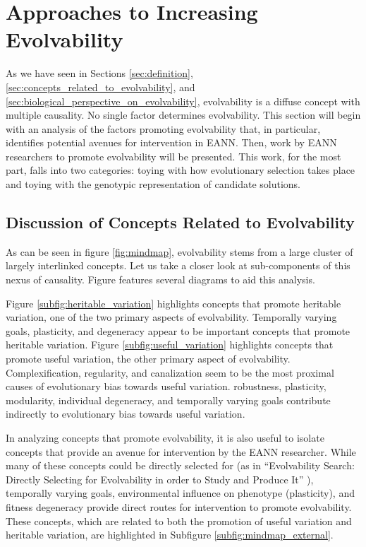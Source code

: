 \chapter{Approaches to Increasing Evolvability} \label{subsec:approaches_to_promoting_evolvability.tex}

As we have seen in Sections \ref{sec:definition}, \ref{sec:concepts_related_to_evolvability}, and \ref{sec:biological_perspective_on_evolvability}, evolvability is a diffuse concept with multiple causality. No single factor determines evolvability. This section will begin with an analysis of the factors promoting evolvability that, in particular, identifies potential avenues for intervention in EANN. Then, work by EANN researchers to promote evolvability will be presented. This work, for the most part, falls into two categories: toying with how evolutionary selection takes place and toying with the genotypic representation of candidate solutions.

\section{Discussion of Concepts Related to Evolvability}
As can be seen in figure \ref{fig:mindmap}, evolvability stems from a large cluster of largely interlinked concepts. Let us take a closer look at sub-components of this nexus of causality. Figure  features several diagrams to aid this analysis. 

Figure \ref{subfig:heritable_variation} highlights concepts that promote heritable variation, one of the two primary aspects of evolvability. Temporally varying goals, plasticity, and degeneracy appear to be important concepts that promote heritable variation. Figure \ref{subfig:useful_variation} highlights concepts that promote useful variation, the other primary aspect of evolvability. Complexification, regularity, and canalization seem to be the most proximal causes of evolutionary bias towards useful variation. robustness, plasticity, modularity, individual degeneracy, and temporally varying goals contribute indirectly to evolutionary bias towards useful variation.

In analyzing concepts that promote evolvability, it is also useful to isolate concepts that provide an avenue for intervention by the EANN researcher. While many of these concepts could be directly selected for (as in ``Evolvability Search: Directly Selecting for Evolvability in order to Study and Produce It'' \cite{Mengistu2016EvolvabilityIt}), temporally varying goals, environmental influence on phenotype (plasticity), and fitness degeneracy provide direct routes for intervention to promote evolvability. These concepts, which are related to both the promotion of useful variation and heritable variation, are highlighted in Subfigure \ref{subfig:mindmap_external}.


